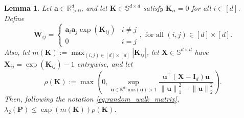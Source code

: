 \documentclass[11pt]{article}
\newtheorem{lemma}{Lemma}
\newcommand{\defeq}{:=}
\newcommand{\norm}[1]{\left\lVert#1\right\rVert}
\newcommand{\lam}{\lambda}
\newcommand{\R}{\mathbb{R}}
\newcommand{\1}{\mathbf{1}}
\newcommand{\0}{\mathbf{0}}
\newcommand{\id}{\mathbf{I}}
\newcommand{\Par}[1]{\left(#1\right)}
\newcommand{\Sym}{\mathbb{S}}
\newcommand{\nnz}{\mathrm{nnz}}
\newcommand{\mk}{{\mathbf{K}}}
\newcommand{\mpp}{{\mathbf{P}}}
\newcommand{\mw}{{\mathbf{W}}}
\newcommand{\mx}{{\mathbf{X}}}
\newcommand{\va}{{\mathbf{a}}}
\newcommand{\vu}{{\mathbf{u}}}
\begin{document}
\begin{lemma}\label{lem:main_sgt}
Let $\va \in \R^d_{>0}$, and let $\mk \in \Sym^{d \times d}$ satisfy $\mk_{ii} = 0$ for all $i \in [d]$. Define
\begin{equation}\label{eq:induced_w}\mw_{ij} = \begin{cases} \va_i\va_j\exp\Par{\mk_{ij}} & i \neq j \\ 
0 & i = j\end{cases}, \text{ for all } (i, j) \in [d] \times [d].\end{equation}
Also, let $m(\mk) \defeq \max_{(i,j) \in[d]\times[d]}|\mk_{ij}|$, let $\mx \in \Sym^{d \times d}$ have $\mx_{ij} = \exp(\mk_{ij}) - 1$ entrywise, and let
\begin{equation}\label{eq:rho_def}\rho(\mk) \defeq \max\Par{0, \sup_{\vu \in \R^d: \nnz(\vu) > 1} \frac{\vu^\top\Par{\mx - \id_d}\vu}{\norm{\vu}_1^2 - \norm{\vu}_2^2}}.\end{equation}
Then, following the notation \eqref{eq:random_walk_matrix}, $\lam_2(\mpp) \le \exp(m(\mk))\rho(\mk)$.
\end{lemma}
\end{document}
